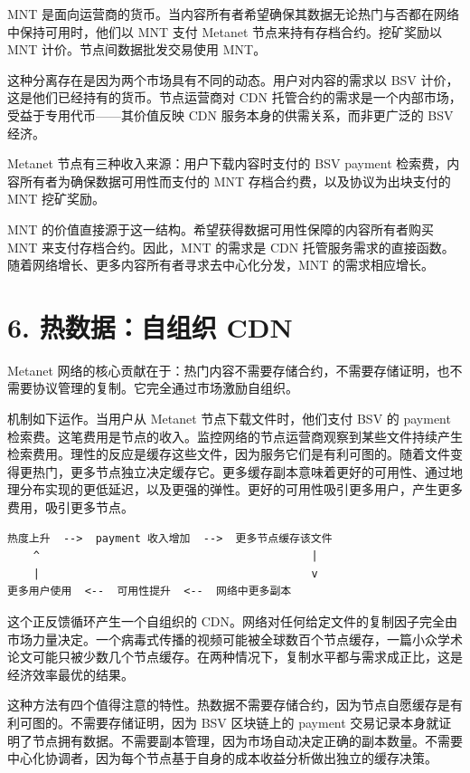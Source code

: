 \documentclass[11pt,a4paper]{article}
\begin{document}
MNT 是面向运营商的货币。当内容所有者希望确保其数据无论热门与否都在网络中保持可用时，他们以 MNT 支付 Metanet 节点来持有存档合约。挖矿奖励以 MNT 计价。节点间数据批发交易使用 MNT。

这种分离存在是因为两个市场具有不同的动态。用户对内容的需求以 BSV 计价，这是他们已经持有的货币。节点运营商对 CDN 托管合约的需求是一个内部市场，受益于专用代币——其价值反映 CDN 服务本身的供需关系，而非更广泛的 BSV 经济。

Metanet 节点有三种收入来源：用户下载内容时支付的 BSV payment 检索费，内容所有者为确保数据可用性而支付的 MNT 存档合约费，以及协议为出块支付的 MNT 挖矿奖励。

MNT 的价值直接源于这一结构。希望获得数据可用性保障的内容所有者购买 MNT 来支付存档合约。因此，MNT 的需求是 CDN 托管服务需求的直接函数。随着网络增长、更多内容所有者寻求去中心化分发，MNT 的需求相应增长。

\section{6. 热数据：自组织 CDN}

Metanet 网络的核心贡献在于：热门内容不需要存储合约，不需要存储证明，也不需要协议管理的复制。它完全通过市场激励自组织。

机制如下运作。当用户从 Metanet 节点下载文件时，他们支付 BSV 的 payment 检索费。这笔费用是节点的收入。监控网络的节点运营商观察到某些文件持续产生检索费用。理性的反应是缓存这些文件，因为服务它们是有利可图的。随着文件变得更热门，更多节点独立决定缓存它。更多缓存副本意味着更好的可用性、通过地理分布实现的更低延迟，以及更强的弹性。更好的可用性吸引更多用户，产生更多费用，吸引更多节点。

\begin{lstlisting}
热度上升  -->  payment 收入增加  -->  更多节点缓存该文件
    ^                                          |
    |                                          v
更多用户使用  <--  可用性提升  <--  网络中更多副本
\end{lstlisting}

这个正反馈循环产生一个自组织的 CDN。网络对任何给定文件的复制因子完全由市场力量决定。一个病毒式传播的视频可能被全球数百个节点缓存，一篇小众学术论文可能只被少数几个节点缓存。在两种情况下，复制水平都与需求成正比，这是经济效率最优的结果。

这种方法有四个值得注意的特性。热数据不需要存储合约，因为节点自愿缓存是有利可图的。不需要存储证明，因为 BSV 区块链上的 payment 交易记录本身就证明了节点拥有数据。不需要副本管理，因为市场自动决定正确的副本数量。不需要中心化协调者，因为每个节点基于自身的成本收益分析做出独立的缓存决策。
\end{document}
